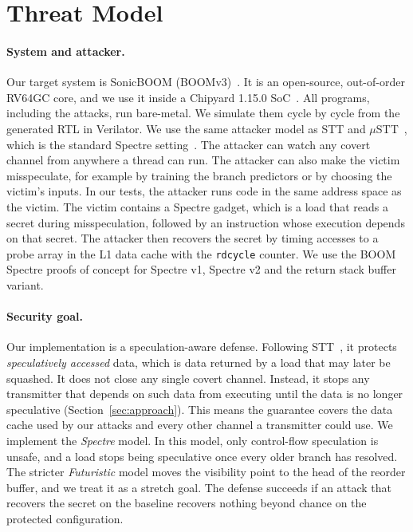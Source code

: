 \section{Threat Model}
\label{sec:threat}

\paragraph{System and attacker.}
Our target system is SonicBOOM (BOOMv3)~\cite{Zhao:SonicBOOM:2020}. It is an
open-source, out-of-order RV64GC core, and we use it inside a Chipyard 1.15.0
SoC~\cite{Amid:Chipyard:2020}. All programs, including the attacks, run bare-metal. We
simulate them cycle by cycle from the generated RTL in Verilator. We use the same 
attacker model as STT and $\mu$STT~\cite{Yu:STT:2019,Chen:uSTT:2025}, which is the 
standard Spectre setting~\cite{SpectreBase}. The attacker can watch any covert channel 
from anywhere a thread can run. The attacker can also make the victim misspeculate, for 
example by training the branch predictors or by choosing the victim's inputs. In our tests, 
the attacker runs code in the same address space as the victim. The victim contains a
Spectre gadget, which is a load that reads a secret during misspeculation, followed by
an instruction whose execution depends on that secret. The attacker then recovers the
secret by timing accesses to a probe array in the L1 data cache with the
\texttt{rdcycle} counter. We use the BOOM Spectre proofs of concept for Spectre v1,
Spectre v2 and the return stack buffer variant.

\paragraph{Security goal.}
Our implementation is a speculation-aware defense. Following STT~\cite{Yu:STT:2019}, it
protects \emph{speculatively accessed} data, which is data returned by a load that may
later be squashed. It does not close any single covert channel. Instead, it stops any
transmitter that depends on such data from executing until the data is no longer
speculative (Section~\ref{sec:approach}). This means the guarantee covers the data
cache used by our attacks and every other channel a transmitter could use. We implement
the \emph{Spectre} model. In this model, only control-flow speculation is unsafe, and a
load stops being speculative once every older branch has resolved. The stricter
\emph{Futuristic} model moves the visibility point to the head of the reorder buffer,
and we treat it as a stretch goal. The defense succeeds if an attack that recovers the
secret on the baseline recovers nothing beyond chance on the protected configuration.

